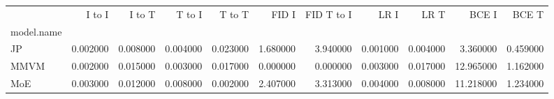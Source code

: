 \begin{tabular}{lrrrrrrrrrr}
\toprule
 & I to I & I to T & T to I & T to T & FID I & FID T to I & LR I & LR T & BCE I & BCE T \\
model.name &  &  &  &  &  &  &  &  &  &  \\
\midrule
JP & 0.002000 & 0.008000 & 0.004000 & 0.023000 & 1.680000 & 3.940000 & 0.001000 & 0.004000 & 3.360000 & 0.459000 \\
MMVM & 0.002000 & 0.015000 & 0.003000 & 0.017000 & 0.000000 & 0.000000 & 0.003000 & 0.017000 & 12.965000 & 1.162000 \\
MoE & 0.003000 & 0.012000 & 0.008000 & 0.002000 & 2.407000 & 3.313000 & 0.004000 & 0.008000 & 11.218000 & 1.234000 \\
\bottomrule
\end{tabular}
